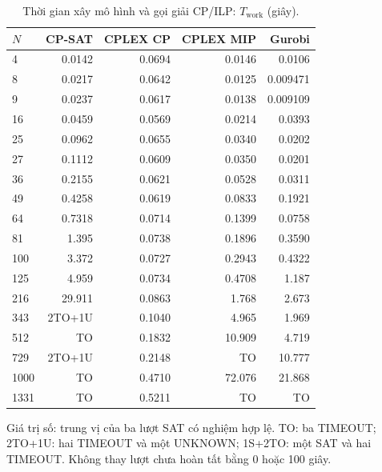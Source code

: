 \begin{table}[pos=H]
\centering
\small
\caption{Thời gian xây mô hình và gọi giải CP/ILP: $T_{\mathrm{work}}$ (giây).}
\label{tab:native_work}
\setlength{\tabcolsep}{4pt}
\begin{tabular}{@{}lrrrr@{}}
\toprule
$N$ & CP-SAT & CPLEX CP & CPLEX MIP & Gurobi \\
\midrule
4 & 0.0142 & 0.0694 & 0.0146 & 0.0106 \\
8 & 0.0217 & 0.0642 & 0.0125 & 0.009471 \\
9 & 0.0237 & 0.0617 & 0.0138 & 0.009109 \\
16 & 0.0459 & 0.0569 & 0.0214 & 0.0393 \\
25 & 0.0962 & 0.0655 & 0.0340 & 0.0202 \\
27 & 0.1112 & 0.0609 & 0.0350 & 0.0201 \\
36 & 0.2155 & 0.0621 & 0.0528 & 0.0311 \\
49 & 0.4258 & 0.0619 & 0.0833 & 0.1921 \\
64 & 0.7318 & 0.0714 & 0.1399 & 0.0758 \\
81 & 1.395 & 0.0738 & 0.1896 & 0.3590 \\
100 & 3.372 & 0.0727 & 0.2943 & 0.4322 \\
125 & 4.959 & 0.0734 & 0.4708 & 1.187 \\
216 & 29.911 & 0.0863 & 1.768 & 2.673 \\
343 & 2TO+1U & 0.1040 & 4.965 & 1.969 \\
512 & TO & 0.1832 & 10.909 & 4.719 \\
729 & 2TO+1U & 0.2148 & TO & 10.777 \\
1000 & TO & 0.4710 & 72.076 & 21.868 \\
1331 & TO & 0.5211 & TO & TO \\
\bottomrule
\end{tabular}
\par\smallskip\begin{minipage}{\linewidth}\footnotesize Giá trị số: trung vị của ba lượt SAT có nghiệm hợp lệ. TO: ba TIMEOUT; 2TO+1U: hai TIMEOUT và một UNKNOWN; 1S+2TO: một SAT và hai TIMEOUT. Không thay lượt chưa hoàn tất bằng 0 hoặc 100 giây.\end{minipage}
\end{table}
